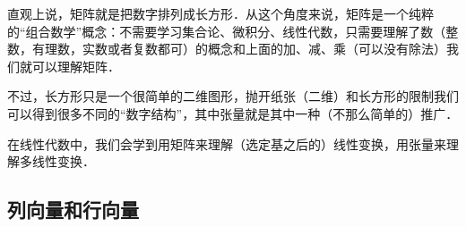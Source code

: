 


直观上说，矩阵就是把数字排列成长方形．从这个角度来说，矩阵是一个纯粹的“组合数学”概念：不需要学习集合论、微积分、线性代数，只需要理解了数（整数，有理数，实数或者复数都可）的概念和上面的加、减、乘（可以没有除法）我们就可以理解矩阵．

不过，长方形只是一个很简单的二维图形，抛开纸张（二维）和长方形的限制我们可以得到很多不同的“数字结构”，其中张量就是其中一种（不那么简单的）推广．

在线性代数中，我们会学到用矩阵来理解（选定基之后的）线性变换，用张量来理解多线性变换．

\subsection{列向量和行向量}




